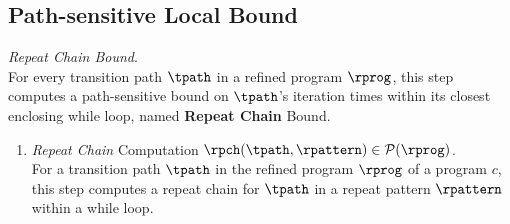 \subsection{Path-sensitive Local Bound}
%
\emph{Repeat Chain Bound}.
  \\
  For every transition path $\tpath$ in a refined program $\rprog$,
  this step computes a path-sensitive
  bound on $\tpath$'s iteration times within its closest enclosing while loop, named \textbf{Repeat Chain} Bound.

  \begin{enumerate}
\item \emph{Repeat Chain} Computation $\rpch(\tpath, \rpattern) \in \mathcal{P}(\rprog)$.
\\
For a transition path $\tpath$ in the refined program $\rprog$ of a program $c$, 
this step computes a repeat chain for $\tpath$ in a repeat pattern $\rpattern$
within a while loop.

\end{enumerate}
